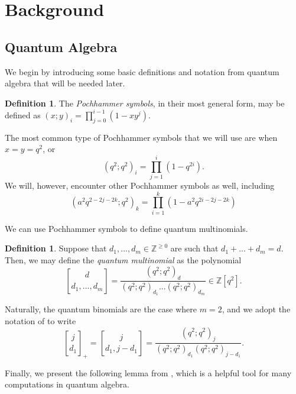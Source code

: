 \documentclass[11pt]{amsart}
\theoremstyle{plain}
\theoremstyle{definition}
\newtheorem{definitionN}[theoremN]{Definition}
\theoremstyle{remark}
\begin{document}
\section{Background}
\label{bgrd}



\subsection{Quantum Algebra}

We begin by introducing some basic definitions and notation from quantum algebra that will be needed later.

\begin{definitionN}
    The \textit{Pochhammer symbols}, in their most general form, may be defined as $(x;y)_i=\prod_{j=0}^{i-1}(1-xy^j)$.

\end{definitionN}

The most common type of Pochhammer symbols that we will use are when $x=y=q^2$, or
\[
(q^2;q^2)_i=\prod_{j=1}^i(1-q^{2i}).
\]
We will, however, encounter other Pochhammer symbols as well, including
\[
(a^2q^{2-2j-2k};q^2)_k=\prod_{i=1}^k(1-a^2q^{2i-2j-2k})
\]

We can use Pochhammer symbols to define quantum multinomials.

\begin{definitionN}
    Suppose that $d_1,...,d_m\in\mathbb{Z}^{\geq0}$ are such that $d_1+...+d_m=d$. Then, we may define the \textit{quantum multinomial} as the polynomial
    \begin{equation*}
    {d\brack d_1,...,d_m}=\frac{(q^2;q^2)_d}{(q^2;q^2)_{d_1}...(q^2;q^2)_{d_m}}\in \mathbb{Z}[q^2].
\end{equation*}
\end{definitionN}

Naturally, the quantum binomials are the case where $m=2$, and we adopt the notation of \cite{SW21} to write
\begin{equation*}
    {j\brack d_1}_+={j\brack d_1,j-d_1}=\frac{(q^2;q^2)_j}{(q^2;q^2)_{d_1}(q^2;q^2)_{j-d_1}}.
\end{equation*}

Finally, we present the following lemma from \cite{K19}, which is a helpful tool for many computations in quantum algebra. 
\end{document}
